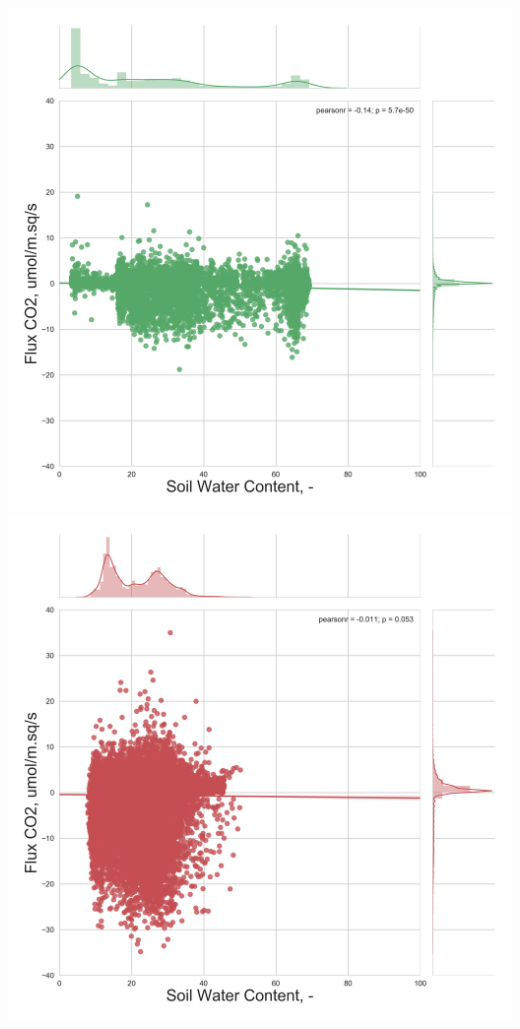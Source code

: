 \documentclass{beamer}
\begin{document}
\begin{frame}
\begin{columns}[t]
\centering
\includegraphics[width=\textwidth]{FvsSWC/CA-NS6.png}\\
\includegraphics[width=\textwidth]{FvsSWC/CA-Oas.png}

\end{columns}
\end{frame}
\end{document}
